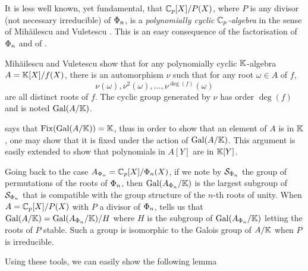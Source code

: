 It is less well known, yet fundamental, that $\mathbb{C}_p[X]/P(X)$, where $P$
is any divisor (not necessary irreducible) of $\Phi_n$, is a
\emph{polynomially cyclic $\mathbb{C}_p$-algebra} in the sense of Mih\u
ailescu and Vuletescu \cite{MV}. This is an easy consequence of the
factorisation of $\Phi_n$ and of \cite[Theorem 2.4]{MV}.

Mih\u ailescu and Vuletescu show that for any polynomially cyclic
$\mathbb{K}$-algebra $A=\mathbb{K}[X]/f(X)$, there is an automorphism $\nu$ such that
for any root $\omega\in A$ of $f$,
\[\nu(\omega),\nu^2(\omega),\ldots,\nu^{\deg(f)}(\omega)\]
are all distinct roots of $f$. The cyclic group generated by $\nu$ has
order $\deg(f)$ and is noted $\operatorname{Gal}(A/\mathbb{K})$.

\cite[Theorem 3.2]{MV} says that $\operatorname{Fix}(\operatorname{Gal}(A/\mathbb{K})) = \mathbb{K}$, thus in
order to show that an element of $A$ is in $\mathbb{K}$, one may show that it
is fixed under the action of $\operatorname{Gal}(A/\mathbb{K})$. This argument is easily
extended to show that polynomials in $A[Y]$ are in $\mathbb{K}[Y]$.

Going back to the case $A_{\Phi_n} = \mathbb{C}_p[X]/\Phi_n(X)$, if we
note by $\mathcal{S}_{\Phi_n}$ the group of permutations of the
roots of $\Phi_n$, then $\operatorname{Gal}(A_{\Phi_n}/\mathbb{K})$ is the largest
subgroup of $\mathcal{S}_{\Phi_n}$ that is compatible with the group
structure of the $n$-th roots of unity. When $A = \mathbb{C}_p[X]/P(X)$ with
$P$ a divisor of $\Phi_n$, \cite[Theorem 5.2]{MV} tells us that
$\operatorname{Gal}(A/\mathbb{K}) = \operatorname{Gal}(A_{\Phi_n}/\mathbb{K})/H$ where $H$ is the subgroup of
$\operatorname{Gal}(A_{\Phi_n}/\mathbb{K})$ letting the roots of $P$ stable. Such a group
is isomorphic to the Galois group of $A/\mathbb{K}$ when $P$ is irreducible.

Using these tools, we can easily show the following lemma

